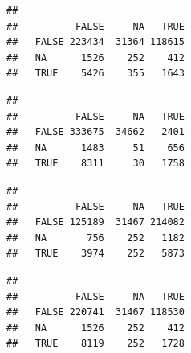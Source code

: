 \documentclass[
]{book}
\newenvironment{Shaded}{\begin{snugshade}}{\end{snugshade}}
\newcommand{\CommentTok}[1]{\textcolor[rgb]{0.56,0.35,0.01}{\textit{#1}}}
\newcommand{\KeywordTok}[1]{\textcolor[rgb]{0.13,0.29,0.53}{\textbf{#1}}}
\newcommand{\NormalTok}[1]{#1}
\newcommand{\OperatorTok}[1]{\textcolor[rgb]{0.81,0.36,0.00}{\textbf{#1}}}
\begin{document}
\begin{Shaded}
\end{Shaded}

\begin{verbatim}
##        
##          FALSE     NA   TRUE
##   FALSE 223434  31364 118615
##   NA      1526    252    412
##   TRUE    5426    355   1643
\end{verbatim}

\begin{Shaded}
\end{Shaded}

\begin{verbatim}
##        
##          FALSE     NA   TRUE
##   FALSE 333675  34662   2401
##   NA      1483     51    656
##   TRUE    8311     30   1758
\end{verbatim}

\begin{Shaded}
\end{Shaded}

\begin{verbatim}
##        
##          FALSE     NA   TRUE
##   FALSE 125189  31467 214082
##   NA       756    252   1182
##   TRUE    3974    252   5873
\end{verbatim}

\begin{Shaded}
\end{Shaded}

\begin{verbatim}
##        
##          FALSE     NA   TRUE
##   FALSE 220741  31467 118530
##   NA      1526    252    412
##   TRUE    8119    252   1728
\end{verbatim}
\end{document}

